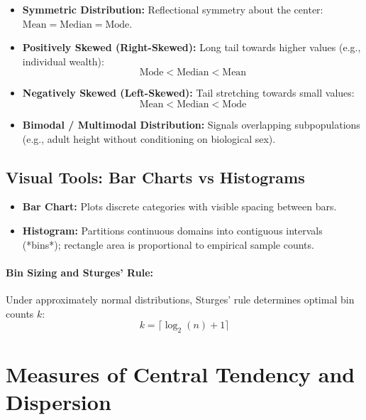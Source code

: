 \begin{itemize}
    \item \textbf{Symmetric Distribution:} Reflectional symmetry about the center: $\text{Mean} = \text{Median} = \text{Mode}$.
    \item \textbf{Positively Skewed (Right-Skewed):} Long tail towards higher values (e.g., individual wealth):
    \begin{equation}
        \text{Mode} < \text{Median} < \text{Mean}
    \end{equation}
    \item \textbf{Negatively Skewed (Left-Skewed):} Tail stretching towards small values:
    \begin{equation}
        \text{Mean} < \text{Median} < \text{Mode}
    \end{equation}
    \item \textbf{Bimodal / Multimodal Distribution:} Signals overlapping subpopulations (e.g., adult height without conditioning on biological sex).
\end{itemize}

\subsection{Visual Tools: Bar Charts vs Histograms}
\begin{itemize}
    \item \textbf{Bar Chart:} Plots discrete categories with visible spacing between bars.
    \item \textbf{Histogram:} Partitions continuous domains into contiguous intervals (*bins*); rectangle area is proportional to empirical sample counts.
\end{itemize}

\paragraph{Bin Sizing and Sturges' Rule:}
Under approximately normal distributions, Sturges' rule determines optimal bin counts $k$:
\begin{equation}
    k = \lceil \log_2(n) + 1 \rceil
\end{equation}

\FloatBarrier
\section{Measures of Central Tendency and Dispersion}


